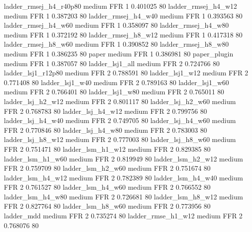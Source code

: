 ladder_rmsej_h4_r40p80     medium      FFR                 1 0.401025 80
   ladder_rmsej_h4_w12     medium      FFR                 1 0.387203 80
   ladder_rmsej_h4_w40     medium      FFR                 1 0.393563 80
   ladder_rmsej_h4_w60     medium      FFR                 1 0.358097 80
   ladder_rmsej_h4_w80     medium      FFR                 1 0.372192 80
   ladder_rmsej_h8_w12     medium      FFR                 1 0.417318 80
   ladder_rmsej_h8_w60     medium      FFR                 1 0.390852 80
   ladder_rmsej_h8_w80     medium      FFR                 1 0.386235 80
                 paper     medium      FFR                 1 0.386981 80
          paper_plugin     medium      FFR                 1 0.387057 80
       ladder_lsj1_all     medium      FFR                 2 0.724766 80
    ladder_lsj1_r12p80     medium      FFR                 2 0.788591 80
       ladder_lsj1_w12     medium      FFR                 2 0.771408 80
       ladder_lsj1_w40     medium      FFR                 2 0.789163 80
       ladder_lsj1_w60     medium      FFR                 2 0.766401 80
       ladder_lsj1_w80     medium      FFR                 2 0.765011 80
     ladder_lsj_h2_w12     medium      FFR                 2 0.801117 80
     ladder_lsj_h2_w60     medium      FFR                 2 0.768783 80
     ladder_lsj_h4_w12     medium      FFR                 2 0.799756 80
     ladder_lsj_h4_w40     medium      FFR                 2 0.749705 80
     ladder_lsj_h4_w60     medium      FFR                 2 0.770846 80
     ladder_lsj_h4_w80     medium      FFR                 2 0.783003 80
     ladder_lsj_h8_w12     medium      FFR                 2 0.777003 80
     ladder_lsj_h8_w60     medium      FFR                 2 0.751471 80
     ladder_lsm_h1_w12     medium      FFR                 2 0.829385 80
     ladder_lsm_h1_w60     medium      FFR                 2 0.819949 80
     ladder_lsm_h2_w12     medium      FFR                 2 0.759709 80
     ladder_lsm_h2_w60     medium      FFR                 2 0.751674 80
     ladder_lsm_h4_w12     medium      FFR                 2 0.782389 80
     ladder_lsm_h4_w40     medium      FFR                 2 0.761527 80
     ladder_lsm_h4_w60     medium      FFR                 2 0.766552 80
     ladder_lsm_h4_w80     medium      FFR                 2 0.726681 80
     ladder_lsm_h8_w12     medium      FFR                 2 0.827764 80
     ladder_lsm_h8_w60     medium      FFR                 2 0.773956 80
            ladder_mdd     medium      FFR                 2 0.735274 80
    ladder_rmse_h1_w12     medium      FFR                 2 0.768076 80
